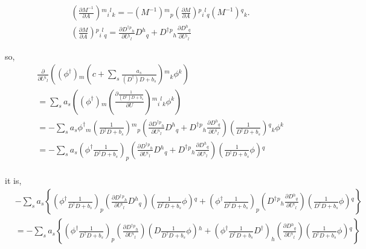 \begin{equation}
\begin{split}
&\left(\frac{\partial M^{-1}}{\partial A}\right){}^m{}_i{}^l{}_k= -(M^{-1}){}^m{}_p \left(\frac{\partial M}{\partial A}\right){}^p{}_i{}^l{}_q (M^{-1}){}^q{}_k.\\
&\left(\frac{\partial M}{\partial A}\right){}^p{}_i{}^l{}_q = \frac{\partial D^{\dagger}{}^p{}_h}{\partial U{}^i{}_l} D{}^h{}_q+D^{\dagger}{}^p{}_h \frac{\partial D{}^h{}_q}{\partial U{}^i{}_l}
\end{split}
\end{equation}

so,
\begin{equation}
\begin{split}
&\frac{\partial}{\partial U{}^i{}_l}\left((\phi ^{\dagger}){}_m \left(c+\sum _s\frac{a_s}{(D^{\dagger})  D{}+b_s}\right){}^m{}_k \phi{}^k\right)\\
&=\sum _sa_s\left((\phi ^{\dagger}){}_m \left(\frac{\partial \frac{1}{(D^{\dagger})  D+b_s}}{\partial U}\right){}^m{}_i{}^l{}_k \phi{}^k\right)\\
&=-\sum _sa_s\phi ^{\dagger}{}_m \left(\frac{1}{D^{\dagger}D+b_s}\right){}^m{}_p\left(\frac{\partial D^{\dagger}{}^p{}_h}{\partial U{}^i{}_l} D{}^h{}_q+D^{\dagger}{}^p{}_h \frac{\partial D{}^h{}_q}{\partial U{}^i{}_l}\right) \left(\frac{1}{D^{\dagger}D+b_s}\right){}^q{}_k\phi{}^k\\
&=-\sum _sa_s{} \left(\phi ^{\dagger}\frac{1}{D^{\dagger}D+b_s}\right)_p\left(\frac{\partial D^{\dagger}{}^p{}_h}{\partial U{}^i{}_l} D{}^h{}_q+D^{\dagger}{}^p{}_h \frac{\partial D{}^h{}_q}{\partial U{}^i{}_l}\right) \left(\frac{1}{D^{\dagger}D+b_s}\phi\right){}^q{}\\
\end{split}
\end{equation}

it is,
\begin{equation}
\begin{split}
&-\sum _sa_s{} \left\{\left(\phi ^{\dagger}\frac{1}{D^{\dagger}D+b_s}\right)_p\left(\frac{\partial D^{\dagger}{}^p{}_h}{\partial U{}^i{}_l} D{}^h{}_q\right) \left(\frac{1}{D^{\dagger}D+b_s}\phi\right){}^q+ 
\left(\phi ^{\dagger}\frac{1}{D^{\dagger}D+b_s}\right)_p\left(D^{\dagger}{}^p{}_h \frac{\partial D{}^h{}_q}{\partial U{}^i{}_l}\right) \left(\frac{1}{D^{\dagger}D+b_s}\phi\right){}^q\right\}\\
&=-\sum _sa_s{} \left\{\left(\phi ^{\dagger}\frac{1}{D^{\dagger}D+b_s}\right)_p\left(\frac{\partial D^{\dagger}{}^p{}_h}{\partial U{}^i{}_l} \right) \left(D\frac{1}{D^{\dagger}D+b_s}\phi\right){}^h+ 
\left(\phi ^{\dagger}\frac{1}{D^{\dagger}D+b_s}D^{\dagger}\right)_h\left(\frac{\partial D{}^h{}_q}{\partial U{}^i{}_l}\right) \left(\frac{1}{D^{\dagger}D+b_s}\phi\right){}^q\right\}
\end{split}
\end{equation}

